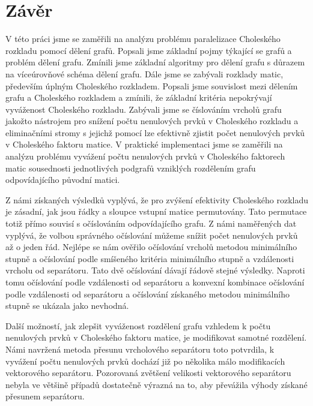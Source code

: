 \documentclass{ctuthesis}
\theoremstyle{plain}
\theoremstyle{definition}
\begin{document}

\chapter*{Závěr}

V této práci jsme se zaměřili na analýzu problému paralelizace Choleského rozkladu pomocí dělení grafů. Popsali jsme základní pojmy týkající se grafů a problém dělení grafu. Zmínili jsme základní algoritmy pro dělení grafu s důrazem na víceúrovňové schéma dělení grafu. Dále jsme se zabývali rozklady matic, především úplným Choleského rozkladem. Popsali jsme souvislost mezi dělením grafu a Choleského rozkladem a zmínili, že základní kritéria nepokrývají vyváženost Choleského rozkladu. Zabývali jsme se číslováním vrcholů grafu jakožto nástrojem pro snížení počtu nenulových prvků v Choleského rozkladu a eliminačními stromy s jejichž pomocí lze efektivně zjistit počet nenulových prvků v Choleského faktoru matice. V praktické implementaci jsme se zaměřili na analýzu problému vyvážení počtu nenulových prvků v Choleského faktorech matic sousednosti jednotlivých podgrafů vzniklých rozdělením grafu odpovídajícího původní matici.

Z námi získaných výsledků vyplývá, že pro zvýšení efektivity Choleského rozkladu je zásadní, jak jsou řádky a sloupce vstupní matice permutovány. Tato permutace totiž přímo souvisí s očíslováním odpovídajícího grafu. Z námi naměřených dat vyplývá, že volbou správného očíslování můžeme snížit počet nenulových prvků až o jeden řád. Nejlépe se nám ověřilo očíslování vrcholů metodou minimálního stupně a očíslování podle smíšeného kritéria minimálního stupně a vzdálenosti vrcholu od separátoru. Tato dvě očíslování dávají řádově stejné výsledky. Naproti tomu očíslování podle vzdálenosti od separátoru a konvexní kombinace očíslování podle vzdálenosti od separátoru a očíslování získaného metodou minimálního stupně se ukázala jako nevhodná.

Další možností, jak zlepšit vyváženost rozdělení grafu vzhledem k počtu nenulových prvků v Choleského faktoru matice, je modifikovat samotné rozdělení. Námi navržená metoda přesunu vrcholového separátoru toto potvrdila, k vyvážení počtu nenulových prvků dochází již po několika málo modifikacích vektorového separátoru. Pozorovaná zvětšení velikosti vektorového separátoru nebyla ve většině případů dostatečně výrazná na to, aby převážila výhody získané přesunem separátoru.
\end{document}
